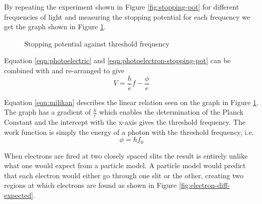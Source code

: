 \documentclass[revision-guide.tex]{subfiles}
\begin{document}

By repeating the experiment shown in Figure \ref{fig:stopping-pot} for different frequencies of light and measuring the stopping potential for each frequency we get the graph shown in Figure \ref{fig:milikan-results}.

\begin{figure}[ht]
  \begin{center}
  \end{center}
  \caption{Stopping potential against threshold frequency}
  \label{fig:milikan-results}
\end{figure}

Equation \ref{eqn:photoelectric} and \ref{eqn:photoelectron-stopping-pot} can be combined with  and re-arranged to give
\begin{equation}\label{eqn:milikan}
V = \frac{h}{e}f - \frac{\phi}{e}
\end{equation}

Equation \ref{eqn:milikan} describes the linear relation seen on the graph in Figure \ref{fig:milikan-results}. The graph has a gradient of $\frac{h}{e}$ which enables the determination of the Planck Constant and the intercept with the x-axis gives the threshold frequency. The work function is simply the energy of a photon with the threshold frequency, i.e.
\begin{equation}
  \phi = hf_0
\end{equation}


When electrons are fired at two closely spaced slits the result is entirely unlike what one would expect from a particle model. A particle model would predict that each electron would either go through one slit or the other, creating two regions at which electrons are found as shown in Figure \ref{fig:electron-diff-expected}.
\end{document}
